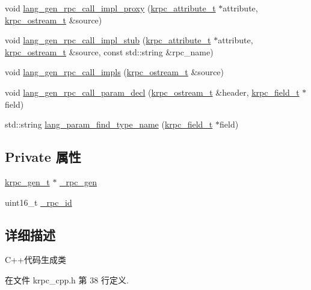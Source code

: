 \begin{DoxyCompactItemize}
\item 
void \hyperlink{classkrpc__gen__cpp__t_a8f72deffcc52027e3c00da6c5fe8ba47}{lang\+\_\+gen\+\_\+rpc\+\_\+call\+\_\+impl\+\_\+proxy} (\hyperlink{classkrpc__attribute__t}{krpc\+\_\+attribute\+\_\+t} $\ast$attribute, \hyperlink{classkrpc__ostream__t}{krpc\+\_\+ostream\+\_\+t} \&source)
\item 
void \hyperlink{classkrpc__gen__cpp__t_a9e7879e26f73cd10ceac6235d850a5e2}{lang\+\_\+gen\+\_\+rpc\+\_\+call\+\_\+impl\+\_\+stub} (\hyperlink{classkrpc__attribute__t}{krpc\+\_\+attribute\+\_\+t} $\ast$attribute, \hyperlink{classkrpc__ostream__t}{krpc\+\_\+ostream\+\_\+t} \&source, const std\+::string \&rpc\+\_\+name)
\item 
void \hyperlink{classkrpc__gen__cpp__t_a4d9712bbf0b8756a59c1b4c3c52d9bbe}{lang\+\_\+gen\+\_\+rpc\+\_\+call\+\_\+impls} (\hyperlink{classkrpc__ostream__t}{krpc\+\_\+ostream\+\_\+t} \&source)
\item 
void \hyperlink{classkrpc__gen__cpp__t_a8ec6338fe6ce5fcacaaefa86dd00d870}{lang\+\_\+gen\+\_\+rpc\+\_\+call\+\_\+param\+\_\+decl} (\hyperlink{classkrpc__ostream__t}{krpc\+\_\+ostream\+\_\+t} \&header, \hyperlink{classkrpc__field__t}{krpc\+\_\+field\+\_\+t} $\ast$field)
\item 
std\+::string \hyperlink{classkrpc__gen__cpp__t_a5d2d628016f11627c4318138af81e70e}{lang\+\_\+param\+\_\+find\+\_\+type\+\_\+name} (\hyperlink{classkrpc__field__t}{krpc\+\_\+field\+\_\+t} $\ast$field)
\end{DoxyCompactItemize}
\subsection*{Private 属性}
\begin{DoxyCompactItemize}
\item 
\hyperlink{classkrpc__gen__t}{krpc\+\_\+gen\+\_\+t} $\ast$ \hyperlink{classkrpc__gen__cpp__t_a73dc8dc1479626650b9f7912cf1e2834}{\+\_\+rpc\+\_\+gen}
\item 
uint16\+\_\+t \hyperlink{classkrpc__gen__cpp__t_a2dfc4f71eefa61cdff3acda3ed786d08}{\+\_\+rpc\+\_\+id}
\end{DoxyCompactItemize}


\subsection{详细描述}
C++代码生成类 

在文件 krpc\+\_\+cpp.\+h 第 38 行定义.



